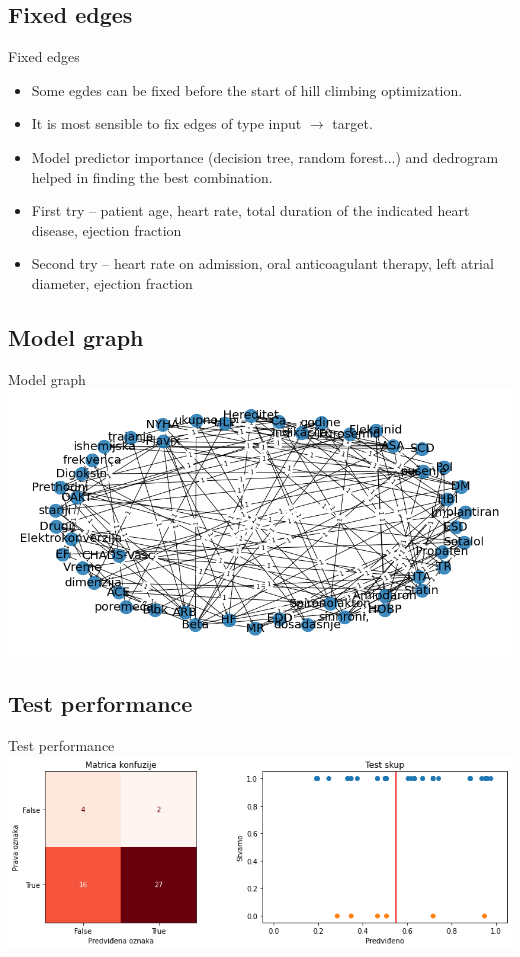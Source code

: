 \documentclass[hyperref={bookmarks=false}]{beamer}
\begin{document}
\subsection{Fixed edges}
\begin{frame}{Fixed edges}
\begin{itemize}
    \item Some egdes can be fixed before the start of hill climbing optimization.
    \item It is most sensible to fix edges of type input $\rightarrow$ target.
    \item Model predictor importance (decision tree, random forest...) and dedrogram helped in finding the best combination.
    \item First try -- patient age, heart rate, total duration of the indicated heart disease, ejection fraction
    \item Second try -- heart rate on admission, oral anticoagulant therapy, left atrial diameter, ejection fraction
\end{itemize}
\end{frame}

\subsection{Model graph}
\begin{frame}{Model graph}
\includegraphics[width=\textwidth]{fixed1.png}
\end{frame}

\subsection{Test performance}
\begin{frame}{Test performance}
\includegraphics[width=\textwidth]{fixed2.png}
\end{frame}
\end{document}
